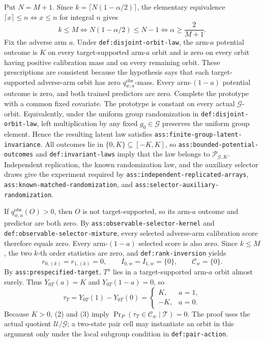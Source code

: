 Put \(N=M+1\). Since \(k=\lceil N(1-\alpha/2)\rceil\), the elementary equivalence \(\lceil x\rceil\le n\Longleftrightarrow x\le n\) for integral \(n\) gives
\[
k\le M\Longleftrightarrow N(1-\alpha/2)\le N-1\Longleftrightarrow \alpha\ge \frac{2}{M+1}.
\tag{1}
\]
Fix the adverse arm \(a\). Under \texttt{def:disjoint-orbit-law}, the arm-\(a\) potential outcome is \(K\) on every target-supported arm-\(a\) orbit and is zero on every orbit having positive calibration mass and on every remaining orbit. These prescriptions are consistent because the hypothesis says that each target-supported adverse-arm orbit has zero \(q^{\mathrm{obs}}_{w,a}\)-mass. Every arm-\((1-a)\) potential outcome is zero, and both trained predictors are zero. Complete the prototype with a common fixed covariate. The prototype is constant on every actual \(\mathcal G\)-orbit. Equivalently, under the uniform group randomization in \texttt{def:disjoint-orbit-law}, left multiplication by any fixed \(g_0\in\mathcal G\) preserves the uniform group element. Hence the resulting latent law satisfies \texttt{ass:finite-group-latent-invariance}. All outcomes lie in \(\{0,K\}\subseteq[-K,K]\), so \texttt{ass:bounded-potential-outcomes} and \texttt{def:invariant-laws} imply that the law belongs to \(\mathcal P_{\mathcal G,K}\). Independent replication, the known randomization law, and the auxiliary selector draws give the experiment required by \texttt{ass:independent-replicated-arrays}, \texttt{ass:known-matched-randomization}, and \texttt{ass:selector-auxiliary-randomization}.

If \(q^{\mathrm{obs}}_{w,a}(O)>0\), then \(O\) is not target-supported, so its arm-\(a\) outcome and predictor are both zero. By \texttt{ass:observable-selector-kernel} and \texttt{def:observable-selector-mixture}, every selected adverse-arm calibration score therefore equals zero. Every arm-\((1-a)\) selected score is also zero. Since \(k\le M\), the two \(k\)-th order statistics are zero, and \texttt{def:rank-inversion} yields
\[
r_{0,(k)}=r_{1,(k)}=0,\qquad I_{0,w}=I_{1,w}=\{0\},\qquad \mathcal C_w=\{0\}.
\tag{2}
\]
By \texttt{ass:prespecified-target}, \(T^a\) lies in a target-supported arm-\(a\) orbit almost surely. Thus \(Y_{0T}(a)=K\) and \(Y_{0T}(1-a)=0\), so
\[
\tau_T=Y_{0T}(1)-Y_{0T}(0)=\begin{cases}K,&a=1,\\-K,&a=0.\end{cases}
\tag{3}
\]
Because \(K>0\), (2) and (3) imply \(\Pr_P(\tau_T\in\mathcal C_w\mid\mathcal T)=0\). The proof uses the actual quotient \(\mathcal U/\mathcal G\); a two-state pair cell may instantiate an orbit in this argument only under the local subgroup condition in \texttt{def:pair-action}.